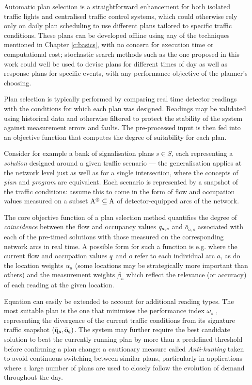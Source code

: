 Automatic plan selection is a straightforward enhancement for both isolated traffic lights and centralised traffic control systems, which could otherwise rely only on daily plan scheduling to use different plans tailored to specific traffic conditions. These plans can be developed offline using any of the techniques mentioned in Chapter \ref{c:basics}, with no concern for execution time or computational cost; stochastic search methods such as the one proposed in this work could well be used to devise plans for different times of day as well as response plans for specific events, with any performance objective of the planner's choosing.

Plan selection is typically performed by comparing real time detector readings with the conditions for which each plan was designed. Readings may be validated using historical data and otherwise filtered to protect the stability of the system against measurement errors and faults. The pre-processed input is then fed into an objective function that computes the degree of suitability for each plan.

Consider for example a bank of signalisation plans $s \in S$, each representing a \emph{solution} designed around a given traffic scenario — the generalisation applies at the network level just as well as for a single intersection, where the concepts of \emph{plan} and \emph{program} are equivalent.
Each scenario is represented by a snapshot of the traffic conditions: assume this to come in the form of flow and occupation values measured on a subset $\mathrm{A}^\oplus \subseteq \mathrm{A}$ of detector-equipped arcs of the network.

The core objective function of a plan selection method quantifies the degree of
\emph{coincidence} between the flow and occupancy values $\bar{q}_{a,s}$ and $\bar{o}_{a,s}$ associated with each of the pre-timed solutions with those measured on the corresponding network arcs in real time. A possible form for such a function is e.g.
where the current flow and occupation values $q$ and $o$ refer to each individual arc $a$, as do the location weights $\alpha_a$ (some locations may be strategically more important than others) and the measurement weights $\beta_a$ which reflect the relevance (or accuracy) of each reading at the given location.

Equation  can easily be extended to account for additional reading types.
The most suitable plan is the one that minimises the performance index $\omega_s$ , representing the divergence of the current traffic conditions from its signature traffic snapshot $(\mathbf{\bar{q}_s}, \mathbf{\bar{o}_s})$.
The system may further require the best candidate solution to beat the currently running
plan by more than a predefined threshold before confirming a plan change: a cautionary
measure called \emph{Anti-hunting} taken to avoid continuous switching between similar plans,
particularly in applications where a large number of plans are used to closely follow the
evolution of demand throughout the day.

